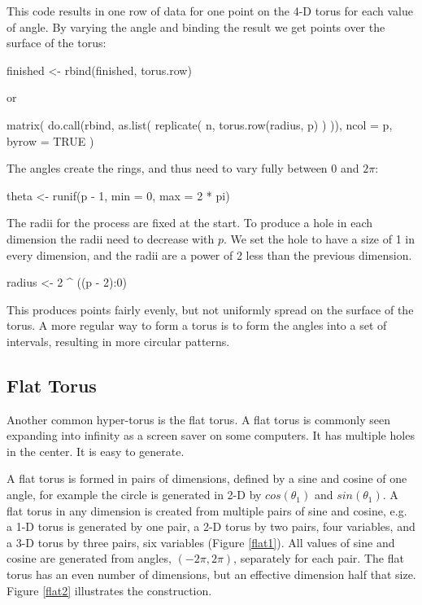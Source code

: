 This code results in one row of data for one point on the 4-D torus
for each value of angle.  By varying the angle and binding the result
we get points over the surface of the torus:

\begin{example}
finished <- rbind(finished, torus.row)
\end{example}

or

\begin{example}
matrix(
  do.call(rbind, as.list(
    replicate(
      n,
      torus.row(radius, p)
    )
  )),
  ncol = p, byrow = TRUE
)
\end{example}

The angles create the rings, and thus need to vary fully between 0 and
$2\pi$:

\begin{example}
theta <- runif(p - 1, min = 0, max = 2 * pi)
\end{example}

The radii for the process are fixed at the start.  To produce a hole
in each dimension the radii need to decrease with $p$.  We set the
hole to have a size of 1 in every dimension, and the radii are a power
of 2 less than the previous dimension.

\begin{example}
radius <- 2 ^ ((p - 2):0)
\end{example}

\noindent This produces points fairly evenly, but not uniformly spread on the surface of
the torus.  A more regular way to form a torus is to form the angles
into a set of intervals, resulting in more circular patterns.

\subsection{Flat Torus}

Another common hyper-torus is the flat torus. A flat torus is commonly
seen expanding into infinity as a screen saver on some computers. It
has multiple holes in the center. It is easy to generate.

A flat torus is formed in pairs of dimensions, defined by a sine and
cosine of one angle, for example the circle is generated in 2-D by
$cos(\theta_1)$ and $sin(\theta_1)$.  A flat torus in any dimension is created
from multiple pairs of sine and cosine, e.g. a 1-D torus is generated by
one pair, a 2-D torus by two pairs, four variables, and a 3-D torus by
three pairs, six variables (Figure \ref{flat1}).  All values of sine
and cosine are generated from angles, $(-2\pi, 2\pi)$, separately for
each pair.  The flat torus has an even number of dimensions, but an
effective dimension half that size. Figure \ref{flat2} illustrates the
construction.

